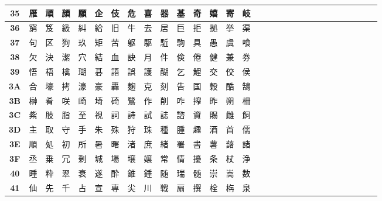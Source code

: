 \begin{table}[H]
\begin{tabular}{|Sc|Sc|Sc|Sc|Sc|Sc|Sc|Sc|Sc|Sc|Sc|Sc|Sc|Sc|Sc|}
\textbf{35} & 雁 & 頑 & 顔 & 願 & 企 & 伎 & 危 & 喜 & 器 & 基 & 奇 & 嬉 & 寄 & 岐 \\ \hline
\textbf{36} & 窮 & 笈 & 級 & 糾 & 給 & 旧 & 牛 & 去 & 居 & 巨 & 拒 & 拠 & 挙 & 渠 \\ \hline
\textbf{37} & 句 & 区 & 狗 & 玖 & 矩 & 苦 & 躯 & 駆 & 駈 & 駒 & 具 & 愚 & 虞 & 喰 \\ \hline
\textbf{38} & 欠 & 決 & 潔 & 穴 & 結 & 血 & 訣 & 月 & 件 & 倹 & 倦 & 健 & 兼 & 券 \\ \hline
\textbf{39} & 悟 & 梧 & 檎 & 瑚 & 碁 & 語 & 誤 & 護 & 醐 & 乞 & 鯉 & 交 & 佼 & 侯 \\ \hline
\textbf{3A} & 合 & 壕 & 拷 & 濠 & 豪 & 轟 & 麹 & 克 & 刻 & 告 & 国 & 穀 & 酷 & 鵠 \\ \hline
\textbf{3B} & 榊 & 肴 & 咲 & 崎 & 埼 & 碕 & 鷺 & 作 & 削 & 咋 & 搾 & 昨 & 朔 & 柵 \\ \hline
\textbf{3C} & 紫 & 肢 & 脂 & 至 & 視 & 詞 & 詩 & 試 & 誌 & 諮 & 資 & 賜 & 雌 & 飼 \\ \hline
\textbf{3D} & 主 & 取 & 守 & 手 & 朱 & 殊 & 狩 & 珠 & 種 & 腫 & 趣 & 酒 & 首 & 儒 \\ \hline
\textbf{3E} & 順 & 処 & 初 & 所 & 暑 & 曙 & 渚 & 庶 & 緒 & 署 & 書 & 薯 & 藷 & 諸 \\ \hline
\textbf{3F} & 丞 & 乗 & 冗 & 剰 & 城 & 場 & 壌 & 嬢 & 常 & 情 & 擾 & 条 & 杖 & 浄 \\ \hline
\textbf{40} & 睡 & 粋 & 翠 & 衰 & 遂 & 酔 & 錐 & 錘 & 随 & 瑞 & 髄 & 崇 & 嵩 & 数 \\ \hline
\textbf{41} & 仙 & 先 & 千 & 占 & 宣 & 専 & 尖 & 川 & 戦 & 扇 & 撰 & 栓 & 栴 & 泉 \\ \hline
\end{tabular}
\end{table}

